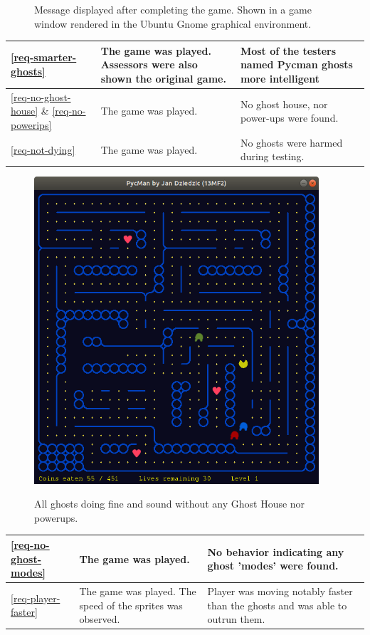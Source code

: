 \documentclass[11pt,a4paper,notitlepage]{report}
\newenvironment{img}{
	\begin{center}
		\begin{figure}[H]
			\begin{center}
			
}{
	\end{center}
		\end{figure}
			\end{center}
}
\begin{document}
\begin{center}
\begin{img}
					\caption{Message displayed after completing the game. Shown in a game window rendered in the Ubuntu Gnome graphical environment.}
				\end{img}
				\begin{longtable}{ | p{2cm} | p{5cm} | p{4cm} |}
					\hline
					\ref{req-smarter-ghosts}&The game was played. Assessors were also shown the original game.&Most of the testers named Pycman ghosts more intelligent\\ \hline
					\ref{req-no-ghost-house} \& \ref{req-no-powerips}&The game was played.&No ghost house, nor power-ups were found.\\ \hline
					\ref{req-not-dying}&The game was played.&No ghosts were harmed during testing.\\ \hline
				\end{longtable}
				\begin{img}
					\includegraphics[width=300pt]{images/all-ghosts-fine.png}\\
					\caption{All ghosts doing fine and sound without any Ghost House nor powerups.}
				\end{img}
				\begin{longtable}{ | p{2cm} | p{5cm} | p{4cm} |}
					\hline	
					\ref{req-no-ghost-modes}&The game was played.&No behavior indicating any ghost 'modes' were found.\\ \hline
					\ref{req-player-faster}&The game was played. The speed of the sprites was observed.&Player was moving notably faster than the ghosts and was able to outrun them.\\ \hline

\end{longtable}
\end{center}
\end{document}
